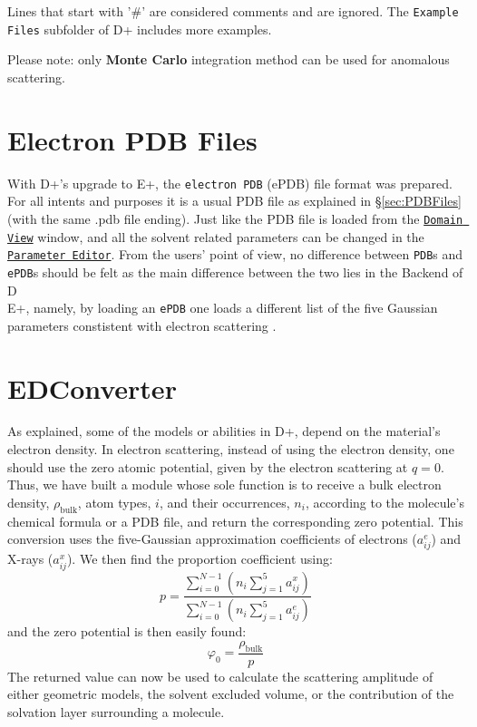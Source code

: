 \documentclass[../D+Manual.tex]{subfiles}
\begin{document}
Lines that start with '\#' are considered comments and are ignored.
The \texttt{Example Files} subfolder of D+ includes more examples. 

Please note: only \textbf{Monte Carlo} integration method can be used for anomalous scattering. 

\section{Electron PDB Files}
With D+'s upgrade to E+, the \texttt{electron PDB} (ePDB) file format was prepared. For all intents and purposes it is a usual PDB file as explained in \S\ref{sec:PDBFiles} (with the same .pdb file ending). Just like the PDB file is loaded from the \hyperref[sec:domainView]{\texttt{Domain View}} window, and all the solvent related parameters can be changed in the \hyperref[sec:parameterEditor]{\texttt{Parameter Editor}}. From the users' point of view, no difference between \texttt{PDB}s and \texttt{ePDB}s should be felt as the main difference between the two lies in the Backend of D\\E+, namely, by loading an \texttt{ePDB} one loads a different list of the five Gaussian parameters constistent with electron scattering \cite{Peng1996, Peng1998}.

\section{EDConverter}
As explained, some of the models or abilities in D+, depend on the material's electron density. In electron scattering, instead of using the electron density, one should use the zero atomic potential, given by the electron scattering at $q=0$. Thus, we have built a module whose sole function is to receive a bulk electron density, $\rho_{\text{bulk}}$, atom types, $i$, and their occurrences, $n_i$, according to the molecule's chemical formula or a PDB file, and return the corresponding zero potential. This conversion uses the five-Gaussian approximation coefficients of electrons ($a^e_{ij}$) and X-rays ($a^x_{ij}$). We then find the proportion coefficient using:
\begin{equation}\label{proportion}
	p = \dfrac{\sum_{i=0}^{N-1} \left(n_i\sum_{j=1}^5 a^x_{ij}\right)}{\sum_{i=0}^{N-1} \left(n_i\sum_{j=1}^5 a^e_{ij}\right)}
\end{equation}
\noindent and the zero potential is then easily found:
\begin{equation}\label{EDconvert}
	\varphi_0 = \dfrac{\rho_{\text{bulk}}}{p}
\end{equation}
\noindent The returned value can now be used to calculate the scattering amplitude of either geometric models, the solvent excluded volume, or the contribution of the solvation layer surrounding a molecule.
\end{document}
